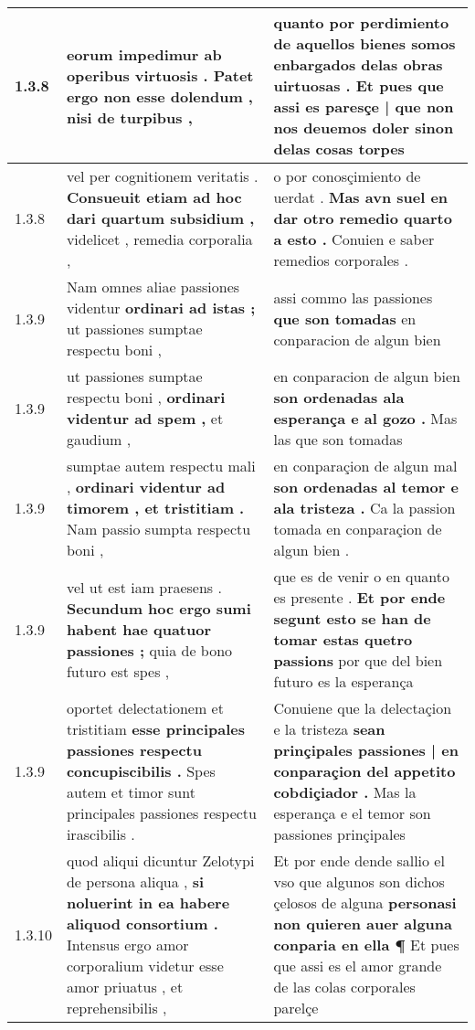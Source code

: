 \begin{tabular}{|p{1cm}|p{6.5cm}|p{6.5cm}|}
1.3.8 & eorum impedimur \textbf{ ab operibus virtuosis . Patet ergo non esse dolendum , } nisi de turpibus , & quanto por perdimiento de aquellos bienes somos enbargados delas obras uirtuosas . \textbf{ Et pues que assi es paresçe | que non nos deuemos doler } sinon delas cosas torpes \\\hline
1.3.8 & vel per cognitionem veritatis . \textbf{ Consueuit etiam ad hoc dari quartum subsidium , } videlicet , remedia corporalia , & o por conosçimiento de uerdat . \textbf{ Mas avn suel en dar otro remedio quarto a esto . } Conuien e saber remedios corporales . \\\hline
1.3.9 & Nam omnes aliae passiones videntur \textbf{ ordinari ad istas ; } ut passiones sumptae respectu boni , & assi commo las passiones \textbf{ que son tomadas } en conparacion de algun bien \\\hline
1.3.9 & ut passiones sumptae respectu boni , \textbf{ ordinari videntur ad spem , } et gaudium , & en conparacion de algun bien \textbf{ son ordenadas ala esperança e al gozo . } Mas las que son tomadas \\\hline
1.3.9 & sumptae autem respectu mali , \textbf{ ordinari videntur ad timorem , et tristitiam . } Nam passio sumpta respectu boni , & en conparaçion de algun mal \textbf{ son ordenadas al temor e ala tristeza . } Ca la passion tomada en conparaçion de algun bien . \\\hline
1.3.9 & vel ut est iam praesens . \textbf{ Secundum hoc ergo sumi habent hae quatuor passiones ; } quia de bono futuro est spes , & que es de venir o en quanto es presente . \textbf{ Et por ende segunt esto se han de tomar estas quetro passions } por que del bien futuro es la esperança \\\hline
1.3.9 & oportet delectationem et tristitiam \textbf{ esse principales passiones respectu concupiscibilis . } Spes autem et timor sunt principales passiones respectu irascibilis . & Conuiene que la delectaçion e la tristeza \textbf{ sean prinçipales passiones | en conparaçion del appetito cobdiçiador . } Mas la esperança e el temor son passiones prinçipales \\\hline
1.3.10 & quod aliqui dicuntur Zelotypi de persona aliqua , \textbf{ si noluerint in ea habere aliquod consortium . } Intensus ergo amor corporalium videtur esse amor priuatus , et reprehensibilis , & Et por ende dende sallio el vso que algunos son dichos çelosos de alguna \textbf{ personasi non quieren auer alguna conparia en ella ¶ } Et pues que assi es el amor grande de las colas corporales parelçe \\\hline

\end{tabular}
